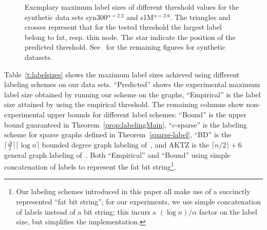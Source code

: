 \begin{figure}[!ht]
\centering
{}\hspace*{-2.5em}
%
\caption{Exemplary maximum label sizes of different threshold values for the synthetic data sets   syn300$^{\alpha=2.2}$ and s1M$^{\alpha=2.6}$. 
The triangles and crosses represent that for the tested threshold the largest label belong to fat, resp. thin node. The star indicate the position of the predicted threshold.
See~\cite{} for the remaining  figures for synthetic datasets.}
\label{fig:findings}%
\end{figure}




Table~\ref{t:labelsizes}  shows  the maximum label sizes achieved using different labeling schemes on our data sets. ``Predicted'' shows the experimental maximum label size obtained by running our scheme on the graphs, ``Empirical'' is the label size attained by using the empirical threshold. The remaining columns show non-experimental upper bounds for different label schemes: ``Bound'' is the upper bound guaranteed in Theorem~\ref{prop:labelingMain}, ``$c$-sparse'' is  the labeling scheme for sparse graphs defined in Theorem~\ref{sparse-label}, ``BD'' is the $\lceil \frac{\Delta}{2} \rceil \lceil \log n\rceil$ bounded degree graph  labeling of~\cite{adjiashvili2014labeling}, and AKTZ is the $\lceil n/2\rceil+6$ general graph  labeling of~\cite{alstrup2014adjacency}.
Both ``Empirical'' and  ``Bound'' using simple concatenation of labels to represent the fat bit string\footnote{Our labeling schemes introduced in this paper all make use of a succinctly represented ``fat bit string''; for our experiments, we use simple concatenation of labels instead of a bit string; this incurs a $(\log n)/\alpha$ factor on the label size, but simplifies the implementation.}.
 

